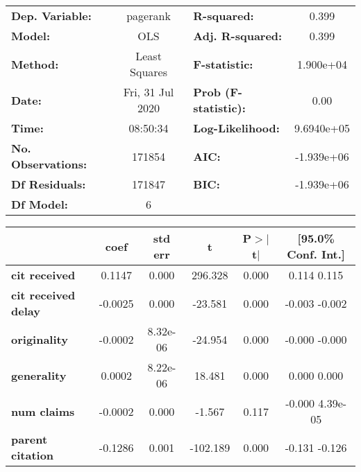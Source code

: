 \begin{center}
\begin{tabular}{lclc}
\toprule
\textbf{Dep. Variable:}     &     pagerank     & \textbf{  R-squared:         } &       0.399     \\
\textbf{Model:}             &       OLS        & \textbf{  Adj. R-squared:    } &       0.399     \\
\textbf{Method:}            &  Least Squares   & \textbf{  F-statistic:       } &   1.900e+04     \\
\textbf{Date:}              & Fri, 31 Jul 2020 & \textbf{  Prob (F-statistic):} &       0.00      \\
\textbf{Time:}              &     08:50:34     & \textbf{  Log-Likelihood:    } &   9.6940e+05    \\
\textbf{No. Observations:}  &      171854      & \textbf{  AIC:               } &   -1.939e+06    \\
\textbf{Df Residuals:}      &      171847      & \textbf{  BIC:               } &   -1.939e+06    \\
\textbf{Df Model:}          &           6      & \textbf{                     } &                 \\
\bottomrule
\end{tabular}
\begin{tabular}{lccccc}
                            & \textbf{coef} & \textbf{std err} & \textbf{t} & \textbf{P$>$$|$t$|$} & \textbf{[95.0\% Conf. Int.]}  \\
\midrule
\textbf{cit received}       &       0.1147  &        0.000     &   296.328  &         0.000        &         0.114     0.115       \\
\textbf{cit received delay} &      -0.0025  &        0.000     &   -23.581  &         0.000        &        -0.003    -0.002       \\
\textbf{originality}        &      -0.0002  &     8.32e-06     &   -24.954  &         0.000        &        -0.000    -0.000       \\
\textbf{generality}         &       0.0002  &     8.22e-06     &    18.481  &         0.000        &         0.000     0.000       \\
\textbf{num claims}         &      -0.0002  &        0.000     &    -1.567  &         0.117        &        -0.000  4.39e-05       \\
\textbf{parent citation}    &      -0.1286  &        0.001     &  -102.189  &         0.000        &        -0.131    -0.126       \\

\end{tabular}
\end{center}

